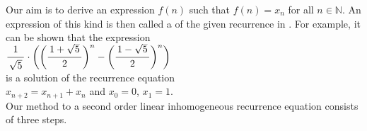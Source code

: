\noindent
Our aim is to derive an expression $f(n)$ such that $f(n) = x_n$ for all $n\in\mathbb{N}$.  An expression of
this kind is then called a  of the given recurrence in .  For example, it can
be shown that the expression
\\[0.2cm]
\hspace*{1.3cm}
$\ds \bruch{1}{\sqrt{5}} \cdot \left(\biggl(\bruch{1+\sqrt{5}}{2}\biggr)^{n} - \biggl(\bruch{1-\sqrt{5}}{2}\biggr)^{n}\right)$ \quad
\\[0.2cm]
is a solution of the recurrence equation 
\\[0.2cm]
\hspace*{1.3cm}
$x_{n+2} = x_{n+1} + x_n$ \quad and \quad $x_0 = 0$, $x_1 = 1$.
\\[0.2cm]
Our method to  a second order linear inhomogeneous recurrence equation consists of three steps.
